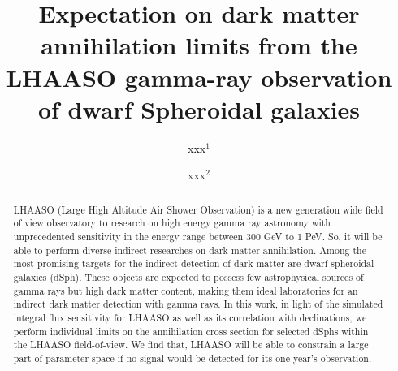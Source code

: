 \documentclass[12pt,prd,showpacs,amsmath,amssymb,aps,floats,floatfix,nofootinbib]{revtex4-1}
\begin{document}
\title{Expectation on dark matter annihilation limits from  the LHAASO gamma-ray observation of dwarf Spheroidal galaxies}

\author{xxx$^1$}
\author{xxx$^2$}



\begin{abstract}
LHAASO (Large High Altitude Air Shower Observation) is a new generation wide field of view observatory to research on high energy gamma ray astronomy with unprecedented sensitivity in the energy range between 300 GeV to 1 PeV. So, it will be able to perform diverse indirect researches on dark matter annihilation.
Among the most promising targets for the indirect detection of dark matter are dwarf spheroidal galaxies (dSph). These objects are expected to possess few astrophysical sources of gamma rays but high dark matter content, making them ideal laboratories for an indirect dark matter detection with gamma rays. In this work, in light of the simulated integral flux sensitivity for LHAASO as well as its correlation with declinations, we perform individual limits on the annihilation cross section for selected dSphs within the LHAASO field-of-view. We find that, LHAASO will be able to constrain a large part of parameter space if no signal would be detected for its one year's observation.


\end{abstract}



\maketitle



\end{document}
